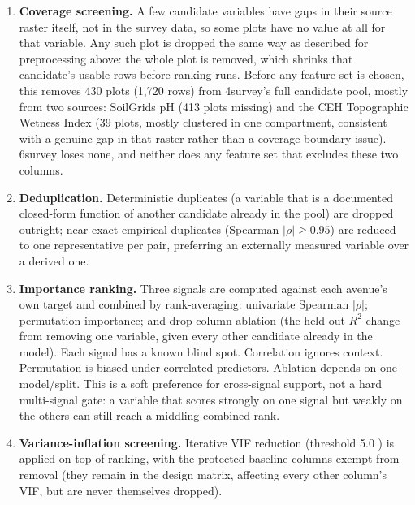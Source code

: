\documentclass[11pt,a4paper]{report}
\begin{document}
\begin{enumerate}
\setlength\itemsep{0pt}
\item \textbf{Coverage screening.} A few candidate variables have gaps in their source raster
  itself, not in the survey data, so some plots have no value at all for that variable. Any such
  plot is dropped the same way as described for preprocessing above: the whole plot is removed,
  which shrinks that candidate's usable rows before ranking runs. Before any feature set is
  chosen, this removes 430 plots (1,720 rows) from 4survey's full candidate pool, mostly from two
  sources: SoilGrids pH (413 plots missing) and the CEH Topographic Wetness Index (39 plots,
  mostly clustered in one compartment, consistent with a genuine gap in that raster rather than a
  coverage-boundary issue). 6survey loses none, and neither does any feature set that excludes
  these two columns.
\item \textbf{Deduplication.} Deterministic duplicates (a variable that is a documented closed-form
  function of another candidate already in the pool) are dropped outright; near-exact empirical
  duplicates (Spearman $|\rho|\geq0.95$) are reduced to one representative per pair, preferring an
  externally measured variable over a derived one.
\item \textbf{Importance ranking.} Three signals are computed against each avenue's own target and
  combined by rank-averaging: univariate Spearman $|\rho|$; permutation importance; and
  drop-column ablation (the held-out $R^2$ change from removing one variable, given every other
  candidate already in the model). Each signal has a known blind spot. Correlation ignores
  context. Permutation is biased under correlated predictors. Ablation depends on one model/split.
  This is a soft preference for cross-signal support, not a hard multi-signal gate: a variable that
  scores strongly on one signal but weakly on the others can still reach a middling combined rank.
\item \textbf{Variance-inflation screening.} Iterative VIF reduction (threshold 5.0
  \citep{dormann2013}) is applied on top of ranking, with the protected baseline columns exempt
  from removal (they remain in the design matrix, affecting every other column's VIF, but are
  never themselves dropped).
\end{enumerate}

\end{document}
